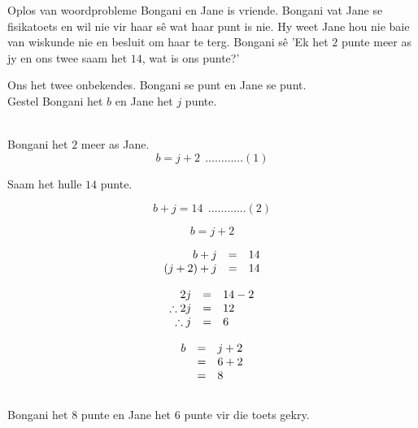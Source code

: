 \begin{wex}{Oplos van woordprobleme}{
Bongani en Jane is vriende. Bongani vat Jane se fisikatoets en wil nie vir haar s\^e wat haar punt is nie. Hy weet Jane hou nie baie van wiskunde nie en besluit om haar te terg. Bongani s\^e 
'Ek het $2$ punte meer as jy en ons twee saam het $14$, wat is ons punte?'}
{
Ons het twee onbekendes. Bongani se punt en Jane se punt.
\\Gestel Bongani het $b$ en Jane het $j$ punte. 

\\Bongani het $2$ meer as Jane.
\begin{equation*}
  b=j+2 ~~\ldots \ldots \ldots \ldots (1)
\end{equation*}

Saam het hulle $14$ punte.

\begin{equation*}
  b+j=14 ~~\ldots \ldots \ldots \ldots (2)
\end{equation*}

\begin{equation*}
b=j+2
\end{equation*}

\begin{equation*}
    \begin{array}{ccc}\hfill b+j& =& 14\hfill \\
	\hfill (j+2)+j& =& 14\hfill \\

    \end{array}
\end{equation*}

\begin{equation*}
    \begin{array}{ccl}\hfill 2j& =& 14 - 2\hfill \\
	\hfill \therefore 2j& =& 12\hfill \\
\hfill \therefore j &=& 6 \hfill

    \end{array}
\end{equation*}

\begin{equation*}
\begin{array}{ccl}\hfill b& =& j+2\hfill \\ & =& 6+2\hfill \\ & =& 8\hfill \end{array}
\end{equation*}
\\
Bongani het $8$ punte en Jane het  $6$ punte vir die toets gekry.\\
}
\end{wex}


